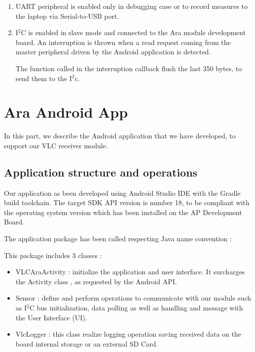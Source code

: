 \begin{enumerate}
\item UART peripheral is enabled only in debugging case or to record measures to the laptop via Serial-to-USB port.

\item I$^2$C is enabled in slave mode and connected to the Ara module development board. An interruption is thrown when a read request coming from the master peripheral driven by the Android application is detected. 

The function called in the interruption callback flush the last 350 bytes, to send them to the I$^2$c.


\end{enumerate}


\section{Ara Android App}

In this part, we describe the Android application that we have developed, to support our VLC receiver module.

\subsection{Application structure and operations}
Our application as been developed using Android Studio IDE \citep{android} with the Gradle build toolchain. The target SDK API version is number 18, to be compliant with the operating system version which has been installed on the AP Development Board.

The application package has been called respecting Java name convention :



This package includes 3 classes :

\begin{itemize}
\item VLCAraActivity : initialize the application and user interface. It surcharges the Activity class , as requested by the Android API.
\item Sensor : define and perform operations to communicate with our module such as I$^2$C bus initialization, data polling as well as handling and message with the User Interface (UI).
\item VlcLogger : this class realize logging operation saving received data on the board internal storage or an external SD Card.
\end{itemize}

